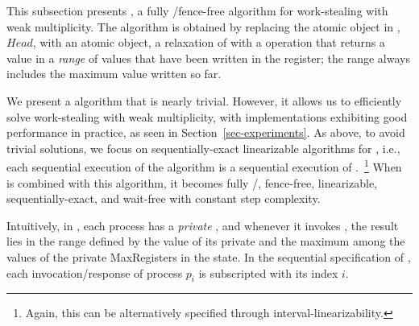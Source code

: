 This subsection presents \NCWSM, a fully \R/\W fence-free algorithm for work-stealing with weak multiplicity.  The algorithm is obtained by replacing the atomic \MaxReg object in \WFWSM, $Head$, with an atomic \RangeMaxReg object, a relaxation of \MaxReg with a \RMaxR operation that returns a value in a \emph{range} of values that have been written in the register; the range always includes the maximum value written so far.

We present a \RangeMaxReg algorithm that is nearly trivial. However, it allows us to efficiently solve work-stealing with weak multiplicity, with implementations exhibiting good performance in practice, as seen in Section~\ref{sec-experiments}.  As above, to avoid trivial solutions, we focus on sequentially-exact linearizable algorithms for \RangeMaxReg, i.e., each sequential execution of the algorithm is a sequential execution of \MaxReg.~\footnote{Again, this can be alternatively specified through interval-linearizability.}  When \NCWSM is combined with this algorithm, it becomes fully \R/\W, fence-free, linearizable, sequentially-exact, and wait-free with constant step complexity.

Intuitively, in \RangeMaxReg, each process has a \emph{private} \MaxReg, and whenever it invokes \RMaxR, the result lies in the range defined by the value of its private \MaxReg and the maximum among the values of the private {\sf MaxRegisters} in the state.  In the sequential specification of \RangeMaxReg, each invocation/response of process $p_i$ is subscripted with its index $i$.



